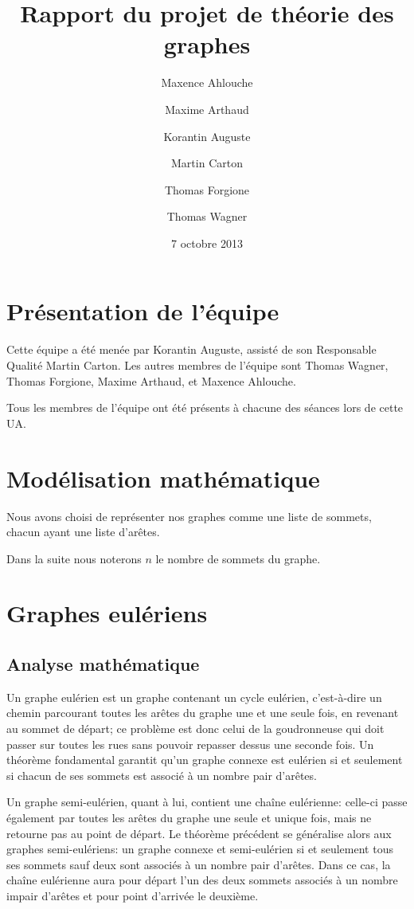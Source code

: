 \documentclass{scrartcl}
\begin{document}
\title{Rapport du projet de théorie des graphes}
\author{Maxence Ahlouche \and Maxime Arthaud \and Korantin Auguste
          \and Martin Carton \and Thomas Forgione \and Thomas Wagner}
\date{7 octobre 2013}
\maketitle
\newpage
\tableofcontents
\newpage

\section{Présentation de l'équipe}
  Cette équipe a été menée par Korantin Auguste, assisté de son Responsable
  Qualité Martin Carton. Les autres membres de l'équipe sont Thomas Wagner,
  Thomas Forgione, Maxime Arthaud, et Maxence Ahlouche.
  
  Tous les membres de l'équipe ont été présents à chacune des séances lors de
  cette UA.

\section{Modélisation mathématique}
  Nous avons choisi de représenter nos graphes comme une liste de sommets,
  chacun ayant une liste d'arêtes.

  Dans la suite nous noterons $n$ le nombre de sommets du graphe.

\section{Graphes eulériens}
  \subsection{Analyse mathématique}
    Un graphe eulérien est un graphe contenant un cycle eulérien, c'est-à-dire
    un chemin parcourant toutes les arêtes du graphe une et une seule fois, en
    revenant au sommet de départ; ce problème est donc celui de la goudronneuse
    qui doit passer sur toutes les rues sans pouvoir repasser dessus une
    seconde fois. Un théorème fondamental garantit qu'un graphe connexe est
    eulérien si et seulement si chacun de ses sommets est associé à un nombre
    pair d'arêtes.

    Un graphe semi-eulérien, quant à lui, contient une chaîne eulérienne:
    celle-ci passe également par toutes les arêtes du graphe une seule et
    unique fois, mais ne retourne pas au point de départ. Le théorème précédent
    se généralise alors aux graphes semi-eulériens: un graphe connexe et
    semi-eulérien si et seulement tous ses sommets sauf deux sont associés à un
    nombre pair d'arêtes. Dans ce cas, la chaîne eulérienne aura pour départ
    l'un des deux sommets associés à un nombre impair d'arêtes et pour point
    d'arrivée le deuxième.
\end{document}
